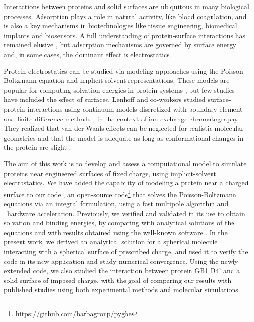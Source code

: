 
Interactions between proteins and solid surfaces are ubiquitous in many biological processes. Adsorption plays a role in natural activity, like blood coagulation, and is also a key mechanisms in biotechnologies like tissue engineering, biomedical implants and biosensors.
A full understanding of protein-surface interactions has remained elusive \cite{Gray2004,RabeVerdesSeegel2011}, but adsorption mechanisms are governed by surface energy and, in some cases, the dominant effect is electrostatics.

Protein electrostatics can be studied via modeling approaches using the Poisson-Boltzmann equation and implicit-solvent representations. These models  are popular for computing solvation energies in protein systems \cite{RouxSimonson1999,Bardhan2012}, but few studies have included the effect of surfaces. Lenhoff and co-workers studied surface-protein interactions using continuum models discretized with boundary-element \cite{YoonLenhoff1992,RothLenhoff1993,AsthagiriLenhoff1997} and finite-difference methods \cite{YaoLenhoff2004,YaoLenhoff2005}, in the context of ion-exchange chromatography. They realized that van der Waals effects can be neglected for realistic molecular geometries \cite{RothNealLenhoff1996} and that the model is adequate as long as conformational changes in the protein are slight \cite{YaoLenhoff2004,YaoLenhoff2005}. 

The aim of this work is to develop and assess a computational model to simulate proteins near engineered surfaces of fixed charge, using implicit-solvent electrostatics.
We have added the capability of modeling a protein near a charged surface to our code \pygbe, an open-source code\footnote{\url{https://github.com/barbagroup/pygbe}}  that solves the Poisson-Boltzmann equations via an integral formulation, using a fast multipole algorithm and \gpu\ hardware acceleration.  Previously, we verified and validated \pygbe in its use to obtain solvation and binding energies, by comparing with analytical solutions of the equations and with results obtained using the well-known \apbs software \cite{CooperBarba-share154331,CooperBardhanBarba2013}. 
In the present work, we derived an analytical solution for a spherical molecule interacting with a spherical surface of prescribed charge, and used it to verify the code in its new application and study numerical convergence.
Using the newly extended code, we also studied the interaction between protein GB1 D4' and a solid surface of imposed charge, with the goal of comparing our results with published studies using both experimental methods and molecular simulations.

